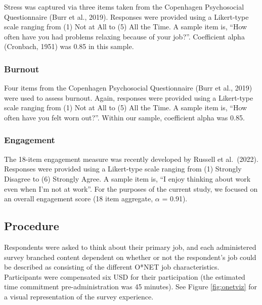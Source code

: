 \documentclass[
  man]{apa7}
\begin{document}
Stress was captured via three items taken from the Copenhagen Psychosocial Questionnaire (Burr et al., 2019). Responses were provided using a Likert-type scale ranging from (1) Not at All to (5) All the Time. A sample item is, ``How often have you had problems relaxing because of your job?''. Coefficient alpha (Cronbach, 1951) was 0.85 in this sample.

\hypertarget{burnout}{%
\subsubsection{Burnout}\label{burnout}}

Four items from the Copenhagen Psychosocial Questionnaire (Burr et al., 2019) were used to assess burnout. Again, responses were provided using a Likert-type scale ranging from (1) Not at All to (5) All the Time. A sample item is, ``How often have you felt worn out?''. Within our sample, coefficient alpha was 0.85.

\hypertarget{engagement}{%
\subsubsection{Engagement}\label{engagement}}

The 18-item engagement measure was recently developed by Russell et al.~(2022). Responses were provided using a Likert-type scale ranging from (1) Strongly Disagree to (6) Strongly Agree. A sample item is, ``I enjoy thinking about work even when I'm not at work''. For the purposes of the current study, we focused on an overall engagement score (18 item aggregate, \(\alpha\) = 0.91).

\hypertarget{procedure}{%
\subsection{Procedure}\label{procedure}}

Respondents were asked to think about their primary job, and each administered survey branched content dependent on whether or not the respondent's job could be described as consisting of the different O*NET job characteristics. Participants were compensated six USD for their participation (the estimated time commitment pre-administration was 45 minutes). See Figure \ref{fig:onetviz} for a visual representation of the survey experience.
\end{document}
